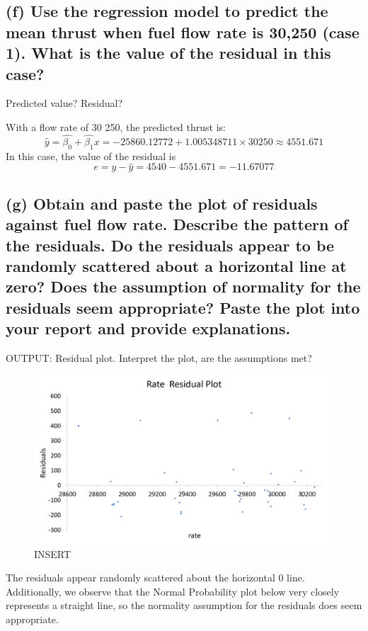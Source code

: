 \documentclass[letterpaper]{article}
\begin{document}
\subsection{(f)	Use the regression model to predict the mean thrust when fuel flow rate is 30,250 (case 1). What is the value of the residual in this case?}
Predicted value? Residual?

With a flow rate of 30 250, the predicted thrust is:
$$\hat{y} = \hat{\beta_0} + \hat{\beta_1}x = -25860.12772 + 1.005348711 \times 30250 \approx 4551.671 $$
In this case, the value of the residual is
$$e = y-\hat{y} = 4540 - 4551.671 = -11.67077$$

\subsection{(g)	Obtain and paste the plot of residuals against fuel flow rate. Describe the pattern of the residuals. Do the residuals appear to be randomly scattered about a horizontal line at zero? Does the assumption of normality for the residuals seem appropriate? Paste the plot into your report and provide explanations.}
OUTPUT: Residual plot. Interpret the plot, are the assumptions met?

\begin{figure}[H]
 \centering
 \includegraphics[width=\textwidth]{rateresidual.png}
 \caption{INSERT}
\end{figure}
The residuals appear randomly scattered about the horizontal 0 line.
Additionally, we observe that the Normal Probability plot below
very closely represents a straight line, so the normality assumption for the
residuals does seem appropriate.
\end{document}
